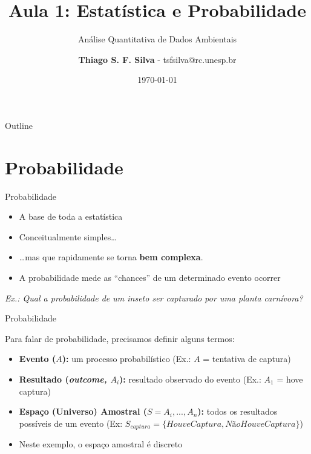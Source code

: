 \documentclass{beamer}\usepackage[]{graphicx}\usepackage[]{color}
\title{Aula 1: Estatística e Probabilidade}
\subtitle{Análise Quantitativa de Dados Ambientais}
\author{\textbf{Thiago S. F. Silva} - tsfsilva@rc.unesp.br}
\institute{Programa de Pós Graduação em Geografia - IGCE/UNESP}
\date{\today}
\begin{document}
\begin{frame}[plain] %
  \titlepage
\end{frame}

\begin{frame}{Outline}
  \tableofcontents
\end{frame}


\section{Probabilidade}

\begin{frame}{Probabilidade}

 \begin{itemize}
   \item A base de toda a estatística
    \vfill
   \item Conceitualmente simples\ldots
    \vfill
   \item \ldots mas que rapidamente se torna \textbf{bem complexa}.
    \vfill
   \item A probabilidade mede as ``chances'' de um determinado evento ocorrer
 \end{itemize}
 \vfill
\emph{Ex.: Qual a probabilidade de um inseto ser capturado por uma planta carnívora?}

\end{frame} 


\begin{frame}{Probabilidade}

Para falar de probabilidade, precisamos definir alguns termos:

\begin{itemize}
  \item \textbf{Evento ($A$):} um processo probabilístico (Ex.: $A$ = tentativa de captura) \pause
  \vfill
  \item \textbf{Resultado (\emph{outcome, $A_i$}): }resultado observado do evento (Ex.: $A_1$ = hove captura) \pause
  \vfill
  \item \textbf{Espaço (Universo) Amostral ($S = A_i,...,A_n$):} todos os resultados possíveis de um evento (Ex: $S_{captura} = \{Houve Captura, Não Houve Captura\}$) \pause
  \vfill
    \item Neste exemplo, o espaço amostral é discreto
    
\end{itemize}


\end{frame} 
\end{document}
